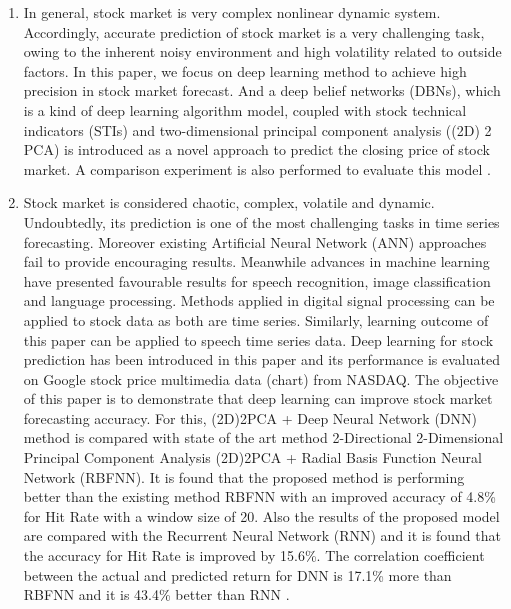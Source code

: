 \documentclass[12pt,journal,compsoc]{IEEEtran}
\begin{document}
\begin{enumerate}
	\item In general, stock market is very complex nonlinear dynamic system. Accordingly, accurate prediction of stock market is a very challenging task, owing to the inherent noisy environment and high volatility related to outside factors. In this paper, we focus on deep learning method to achieve high precision in stock market forecast. And a deep belief networks (DBNs), which is a kind of deep learning algorithm model, coupled with stock technical indicators (STIs) and two-dimensional principal component analysis ((2D) 2 PCA) is introduced as a novel approach to predict the closing price of stock market. A comparison experiment is also performed to evaluate this model \cite{gao2016deep}.
	
	\item Stock market is considered chaotic, complex, volatile and dynamic. Undoubtedly, its prediction is one of the most challenging tasks in time series forecasting. Moreover existing Artificial Neural Network (ANN) approaches fail to provide encouraging results. Meanwhile advances in machine learning have presented favourable results for speech recognition, image classification and language processing. Methods applied in digital signal processing can be applied to stock data as both are time series. Similarly, learning outcome of this paper can be applied to speech time series data. Deep learning for stock prediction has been introduced in this paper and its performance is evaluated on Google stock price multimedia data (chart) from NASDAQ. The objective of this paper is to demonstrate that deep learning can improve stock market forecasting accuracy. For this, (2D)2PCA + Deep Neural Network (DNN) method is compared with state of the art method 2-Directional 2-Dimensional Principal Component Analysis (2D)2PCA + Radial Basis Function Neural Network (RBFNN). It is found that the proposed method is performing better than the existing method RBFNN with an improved accuracy of 4.8\% for Hit Rate with a window size of 20. Also the results of the proposed model are compared with the Recurrent Neural Network (RNN) and it is found that the accuracy for Hit Rate is improved by 15.6\%. The correlation coefficient between the actual and predicted return for DNN is 17.1\% more than RBFNN and it is 43.4\% better than RNN \cite{singh2017stock}.
	

\end{enumerate}
\end{document}
